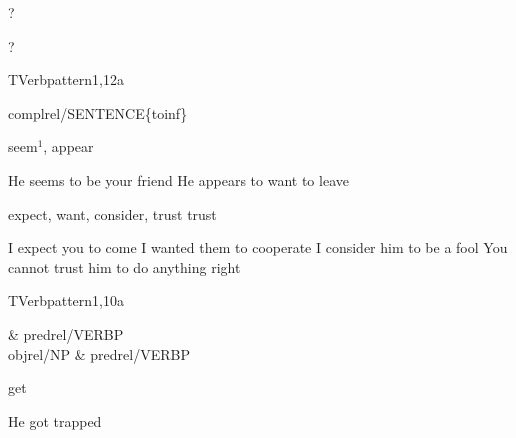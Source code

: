 
\begin{thetadescr}
\evitem ?
\esitem
     \begin{examples}
        \example ?
     \end{examples}
\end{thetadescr}


\newpage
\verbpattern{[synCLOSEDTOSENT] }
\begin{vpattern}
 TVerbpattern1,12a
\csritem \mbox{}\\
     \begin{csr}
      complrel/SENTENCE\{toinf\}
     \end{csr}
\remarksitem
\end{vpattern}


\begin{thetadescr}
\evitem  seem$^{1}$, appear
\esitem
     \begin{examples}
        \example He seems to be your friend
        \example He appears to want to leave
     \end{examples}
\end{thetadescr}



\begin{thetadescr}
\evitem expect, want, consider, trust\index
{trust}
\esitem
     \begin{examples}
        \example I expect you to come
        \example I wanted them to cooperate
        \example I consider him to be a fool
        \example You cannot trust him to do anything right
     \end{examples}
\end{thetadescr}


\newpage
\verbpattern{[synCLOSEDVERBPPROP] }
\begin{vpattern}
 TVerbpattern1,10a
\csritem \mbox{}\\
     \begin{csr}
                & predrel/VERBP\\
      objrel/NP & predrel/VERBP
     \end{csr}
\remarksitem
\end{vpattern}


\begin{thetadescr}
\evitem get
\esitem
     \begin{examples}
        \example  He got trapped
     \end{examples}
\end{thetadescr}


